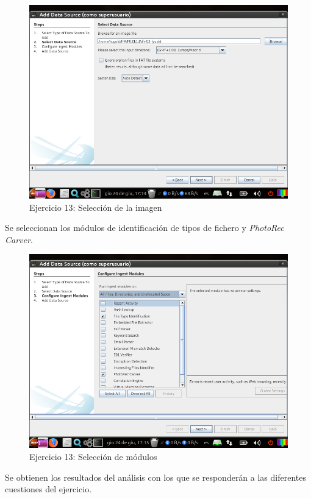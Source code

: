 \documentclass[11pt]{article}
\begin{document}
\begin{figure}[H]
    \caption{Ejercicio 13: Selección de la imagen}
    \centering
    \includegraphics[scale=0.7]{e13-3.png}
\end{figure}

Se seleccionan los módulos de identificación de tipos de fichero y \textit{PhotoRec Carver}.

\begin{figure}[H]
    \caption{Ejercicio 13: Selección de módulos}
    \centering
    \includegraphics[scale=0.7]{e13-4.png}
\end{figure}

Se obtienen los resultados del análisis con los que se responderán a las diferentes cuestiones del ejercicio.
\end{document}
